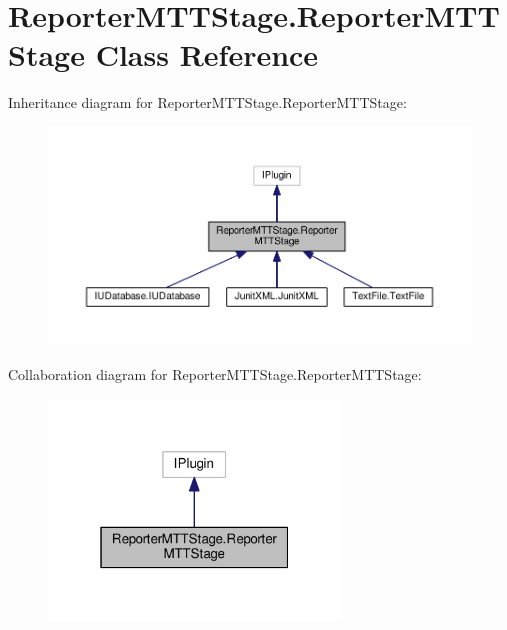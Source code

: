 \hypertarget{class_reporter_m_t_t_stage_1_1_reporter_m_t_t_stage}{\section{Reporter\-M\-T\-T\-Stage.\-Reporter\-M\-T\-T\-Stage Class Reference}
\label{class_reporter_m_t_t_stage_1_1_reporter_m_t_t_stage}
}


Inheritance diagram for Reporter\-M\-T\-T\-Stage.\-Reporter\-M\-T\-T\-Stage\-:
\nopagebreak
\begin{figure}[H]
\begin{center}
\leavevmode
\includegraphics[width=350pt]{class_reporter_m_t_t_stage_1_1_reporter_m_t_t_stage__inherit__graph}
\end{center}
\end{figure}


Collaboration diagram for Reporter\-M\-T\-T\-Stage.\-Reporter\-M\-T\-T\-Stage\-:
\nopagebreak
\begin{figure}[H]
\begin{center}
\leavevmode
\includegraphics[width=220pt]{class_reporter_m_t_t_stage_1_1_reporter_m_t_t_stage__coll__graph}
\end{center}
\end{figure}
